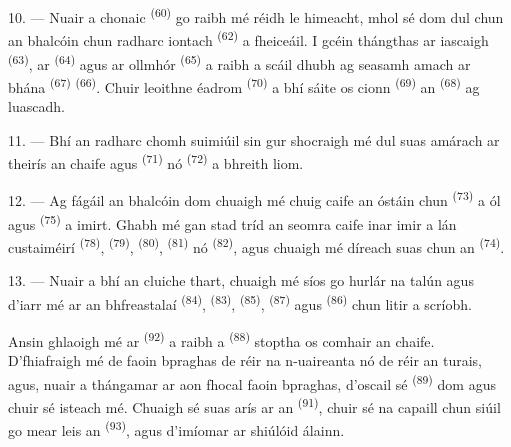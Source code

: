 10. --- Nuair a chonaic  \textsuperscript{(60)} go raibh mé
réidh le himeacht, mhol sé dom dul chun an bhalcóin chun radharc iontach
 \textsuperscript{(62)} a fheiceáil. I gcéin thángthas ar
 iascaigh \textsuperscript{(63)}, ar 
\textsuperscript{(64)} agus ar  ollmhór \textsuperscript{(65)} a
raibh a scáil dhubh ag seasamh amach ar  bhána
\textsuperscript{(67)}  \textsuperscript{(66)}. Chuir leoithne
éadrom  \textsuperscript{(70)} a bhí sáite os cionn
 \textsuperscript{(69)} an  \textsuperscript{(68)} ag
luascadh.

\VUsaut{3.0mm}
\VUsaut{3.0mm}

11. --- Bhí an radharc chomh suimiúil sin gur shocraigh mé dul suas amárach ar
theirís an chaife agus  \textsuperscript{(71)} nó  \textsuperscript{(72)} a bhreith liom.

12. --- Ag fágáil an bhalcóin dom chuaigh mé chuig caife an óstáin chun
 \textsuperscript{(73)} a ól agus 
\textsuperscript{(75)} a imirt. Ghabh mé gan stad tríd an seomra caife inar imir a
lán custaiméirí  \textsuperscript{(78)}, 
\textsuperscript{(79)},  \textsuperscript{(80)},  \textsuperscript{(81)} nó  \textsuperscript{(82)}, agus chuaigh
mé díreach suas chun an  \textsuperscript{(74)}.

13. --- Nuair a bhí an cluiche thart, chuaigh mé síos go hurlár na talún agus d'iarr
mé ar an bhfreastalaí  \textsuperscript{(84)}, 
\textsuperscript{(83)},  \textsuperscript{(85)}, 
\textsuperscript{(87)} agus  \textsuperscript{(86)} chun litir a
scríobh.

Ansin ghlaoigh mé ar  \textsuperscript{(92)} a raibh a
 \textsuperscript{(88)} stoptha os comhair an chaife. D'fhiafraigh
mé de faoin bpraghas de réir na n-uaireanta nó de réir an turais, agus, nuair a
thángamar ar aon fhocal faoin bpraghas, d'oscail sé 
\textsuperscript{(89)} dom agus chuir sé isteach mé. Chuaigh sé suas arís ar an
 \textsuperscript{(91)}, chuir sé na capaill chun siúil go mear leis
an  \textsuperscript{(93)}, agus d'imíomar ar shiúlóid álainn.
